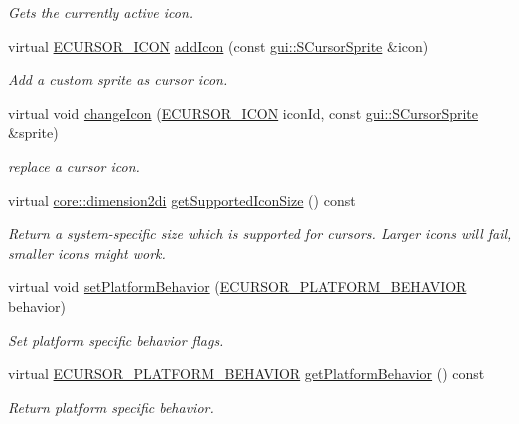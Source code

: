\begin{DoxyCompactItemize}
\begin{DoxyCompactList}\small\item\em Gets the currently active icon. \end{DoxyCompactList}\item 
virtual \hyperlink{namespaceirr_1_1gui_aefee802dd632c5735703e40ef40f879b}{E\+C\+U\+R\+S\+O\+R\+\_\+\+I\+C\+ON} \hyperlink{classirr_1_1gui_1_1ICursorControl_a102ff455c70595886281e636ef063d3b}{add\+Icon} (const \hyperlink{structirr_1_1gui_1_1SCursorSprite}{gui\+::\+S\+Cursor\+Sprite} \&icon)
\begin{DoxyCompactList}\small\item\em Add a custom sprite as cursor icon. \end{DoxyCompactList}\item 
virtual void \hyperlink{classirr_1_1gui_1_1ICursorControl_a3e7c8cb1f03e1ccc31fcc3c30f717762}{change\+Icon} (\hyperlink{namespaceirr_1_1gui_aefee802dd632c5735703e40ef40f879b}{E\+C\+U\+R\+S\+O\+R\+\_\+\+I\+C\+ON} icon\+Id, const \hyperlink{structirr_1_1gui_1_1SCursorSprite}{gui\+::\+S\+Cursor\+Sprite} \&sprite)
\begin{DoxyCompactList}\small\item\em replace a cursor icon. \end{DoxyCompactList}\item 
\mbox{\label{classirr_1_1gui_1_1ICursorControl_a0710b659cbab1474e3486f7dd0e8c35e}} 
virtual \hyperlink{namespaceirr_1_1core_ac79bc3704cf28bc1ab72d7cd1cae78d1}{core\+::dimension2di} \hyperlink{classirr_1_1gui_1_1ICursorControl_a0710b659cbab1474e3486f7dd0e8c35e}{get\+Supported\+Icon\+Size} () const
\begin{DoxyCompactList}\small\item\em Return a system-\/specific size which is supported for cursors. Larger icons will fail, smaller icons might work. \end{DoxyCompactList}\item 
\mbox{\label{classirr_1_1gui_1_1ICursorControl_ad7688bb200945f15877a598e8be53878}} 
virtual void \hyperlink{classirr_1_1gui_1_1ICursorControl_ad7688bb200945f15877a598e8be53878}{set\+Platform\+Behavior} (\hyperlink{namespaceirr_1_1gui_abbd186f9cfba2f805d98248df226acef}{E\+C\+U\+R\+S\+O\+R\+\_\+\+P\+L\+A\+T\+F\+O\+R\+M\+\_\+\+B\+E\+H\+A\+V\+I\+OR} behavior)
\begin{DoxyCompactList}\small\item\em Set platform specific behavior flags. \end{DoxyCompactList}\item 
virtual \hyperlink{namespaceirr_1_1gui_abbd186f9cfba2f805d98248df226acef}{E\+C\+U\+R\+S\+O\+R\+\_\+\+P\+L\+A\+T\+F\+O\+R\+M\+\_\+\+B\+E\+H\+A\+V\+I\+OR} \hyperlink{classirr_1_1gui_1_1ICursorControl_aad19b5b02de0b8bc476c66b152b745c4}{get\+Platform\+Behavior} () const
\begin{DoxyCompactList}\small\item\em Return platform specific behavior. \end{DoxyCompactList}\end{DoxyCompactItemize}
